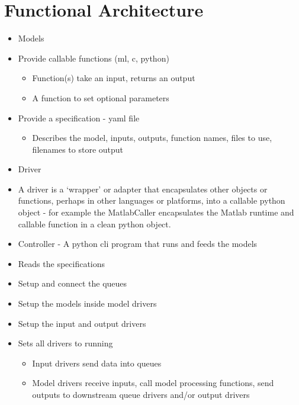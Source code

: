\documentclass[letterpaper,10pt,english]{sphinxmanual}
\begin{document}
\section{Functional Architecture}
\label{\detokenize{includeme:functional-architecture}}\begin{itemize}
\item {} 
Models

\item {} 
Provide callable functions (ml, c, python)
\begin{itemize}
\item {} 
Function(s) take an input, returns an output

\item {} 
A function to set optional parameters

\end{itemize}

\item {} 
Provide a specification - yaml file
\begin{itemize}
\item {} 
Describes the model, inputs, outputs, function names, files to
use, filenames to store output

\end{itemize}

\item {} 
Driver

\item {} 
A driver is a `wrapper' or adapter that encapsulates other objects or
functions, perhaps in other languages or platforms, into a callable
python object - for example the MatlabCaller encapsulates the Matlab
runtime and callable function in a clean python object.

\item {} 
Controller - A python cli program that runs and feeds the models

\item {} 
Reads the specifications

\item {} 
Setup and connect the queues

\item {} 
Setup the models inside model drivers

\item {} 
Setup the input and output drivers

\item {} 
Sets all drivers to running
\begin{itemize}
\item {} 
Input drivers send data into queues

\item {} 
Model drivers receive inputs, call model processing functions,
send outputs to downstream queue drivers and/or output drivers

\end{itemize}

\end{itemize}
\end{document}
